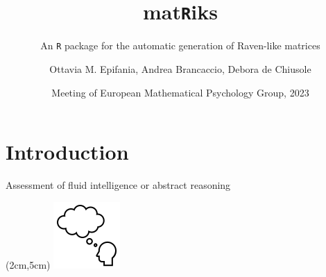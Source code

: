\documentclass{beamer}
\title{mat\texttt{R}iks}
\subtitle{An \texttt{R} package for the automatic generation of Raven-like matrices}
\author{Ottavia M. Epifania, Andrea Brancaccio, Debora de Chiusole}
\institute{Universty of Padova, IT}
\date{Meeting of European Mathematical Psychology Group, 2023}
\begin{document}
	
\begin{frame}[plain]
    \maketitle
\end{frame}

\section{Introduction}

\begin{frame}
	Assessment of fluid intelligence or abstract reasoning 
	
	
	\begin{textblock*}{2cm}(2cm,5cm)
		\includegraphics[width =\linewidth]{img/think1.png}
	\end{textblock*}
	

\end{frame}
\end{document}
